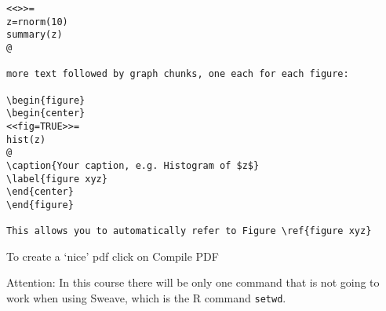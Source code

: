 \documentclass[11pt,a4paper]{article}
\begin{document}
\begin{description}
\begin{verbatim}
<<>>=
z=rnorm(10)
summary(z)
@

more text followed by graph chunks, one each for each figure:

\begin{figure}
\begin{center}
<<fig=TRUE>>=
hist(z)
@
\caption{Your caption, e.g. Histogram of $z$}
\label{figure xyz}
\end{center}
\end{figure}

This allows you to automatically refer to Figure \ref{figure xyz}
\end{verbatim}

To create a `nice' pdf click on {Compile PDF}

Attention: In this course there will be only one command that is not going
to work when using Sweave, which is the R command \texttt{setwd}.

\end{description}
\end{document}
